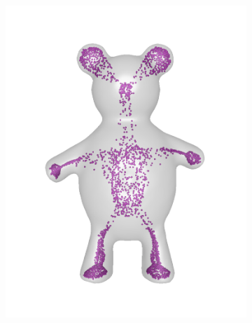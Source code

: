 \documentclass[review]{acmsiggraph}
\begin{document}
\begin{figure}
\begin{subfigure}[b]{0.19\linewidth}
                \includegraphics[width=\textwidth]{images/bear/1.pdf}
        \end{subfigure}
~
		\begin{subfigure}[b]{0.19\linewidth}
                \centering

\end{subfigure}
\end{figure}
\end{document}
